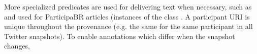 																																																																																																																																																																																																																																																																																																																																																																																																															More specialized predicates are used for delivering text when necessary,
																																																																																																																																																																																																																																																																																																																																																																																																															such as  and  used
																																																																																																																																																																																																																																																																																																																																																																																																															for ParticipaBR articles (instances of the class .
																																																																																																																																																																																																																																																																																																																																																																																																															A participant URI is unique throughout the provenance (e.g. the same for
																																																																																																																																																																																																																																																																																																																																																																																																															the same participant in all Twitter snapshots).
																																																																																																																																																																																																																																																																																																																																																																																																															To enable annotations which differ when the snapshot changes,
